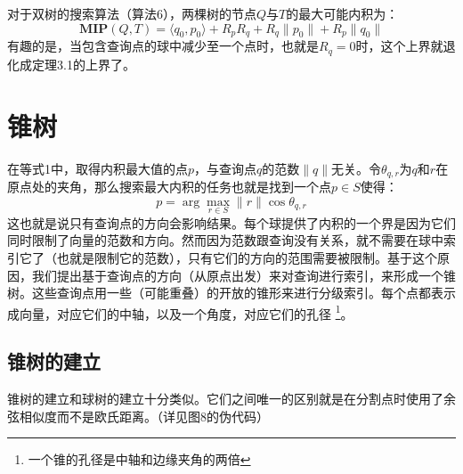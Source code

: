 \documentclass[twocolumn,a4paper]{article}
\begin{document}
对于双树的搜索算法（算法6），两棵树的节点$Q$与$T$的最大可能内积为：
\begin{equation*}
\mathbf{MIP}(Q,T)=\langle q_0,p_0 \rangle + R_p R_q + R_q\|p_0\| + R_p\|q_0\|
\end{equation*}
有趣的是，当包含查询点的球中减少至一个点时，也就是$R_q = 0$时，这个上界就退化成定理3.1的上界了。

\section{锥树}
在等式1中，取得内积最大值的点$p$，与查询点$q$的范数$\|q\|$无关。令$\theta_{q,r}$为$q$和$r$在原点处的夹角，那么搜索最大内积的任务也就是找到一个点$p \in S$使得：
\begin{equation}
p = \arg \max_{r \in S}\|r\|\cos\theta_{q,r}
\end{equation}
这也就是说只有查询点的方向会影响结果。每个球提供了内积的一个界是因为它们同时限制了向量的范数和方向。然而因为范数跟查询没有关系，就不需要在球中索引它了（也就是限制它的范数），只有它们的方向的范围需要被限制。基于这个原因，我们提出基于查询点的方向（从原点出发）来对查询进行索引，来形成一个锥树。这些查询点用一些（可能重叠）的开放的锥形来进行分级索引。每个点都表示成向量，对应它们的中轴，以及一个角度，对应它们的孔径
\footnote{一个锥的孔径是中轴和边缘夹角的两倍}。
\subsection{锥树的建立}
锥树的建立和球树的建立十分类似。它们之间唯一的区别就是在分割点时使用了余弦相似度而不是欧氏距离。（详见图8的伪代码）
\end{document}

